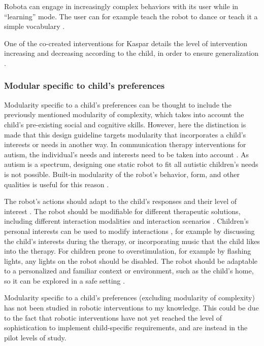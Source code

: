 Robota can engage in increasingly complex behaviors with its user while in ``learning'' mode. The user can for example teach the robot to dance or teach it a simple vocabulary \cite{billard2006building}.

One of the co-created interventions for Kaspar details the level of intervention increasing and decreasing according to the child, in order to ensure generalization \cite{huijnen2017implement}.


\subsubsection{Modular specific to child's preferences}

Modularity specific to a child's preferences can be thought to include the previously mentioned modularity of complexity, which takes into account the child's pre-existing social and cognitive skills. However, here the distinction is made that this design guideline targets modularity that incorporates a child's interests or needs in another way. In communication therapy interventions for autism, the individual's needs and interests need to be taken into account \cite{bonvillian1981sign, tetzchner}. As autism is a spectrum, designing one static robot to fit all autistic children's needs is not possible. Built-in modularity of the robot's behavior, form, and other qualities is useful for this reason \cite{designSpaces,robins2007eliciting}.

The robot's actions should adapt to the child's responses and their level of interest \cite{giullian2010detailed}. The robot should be modifiable for different therapeutic solutions, including different interaction modalities and interaction scenarios \cite{designSpaces, robins2007eliciting, michaud2003characteristics}. Children's personal interests can be used to modify interactions \cite{designSpaces, robins2007eliciting}, for example by discussing the child's interests during the therapy, or incorporating music that the child likes into the therapy. For children prone to overstimulation, for example by flashing lights, any lights on the robot should be disabled. The robot should be adaptable to a personalized and familiar context or environment, such as the child's home, so it can be explored in a safe setting \cite{robins2007eliciting}.

Modularity specific to a child's preferences (excluding modularity of complexity) has not been studied in robotic interventions to my knowledge. This could be due to the fact that robotic interventions have not yet reached the level of sophistication to implement child-specific requirements, and are instead in the pilot levels of study.


